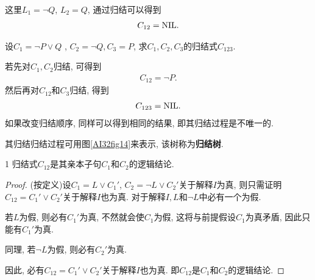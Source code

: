 \begin{result}
这里$L_1=\neg Q$, $L_2=Q$, 通过归结可以得到
\begin{align}
  C_{12}= \textup{NIL}.
\end{align}
\end{result}
\begin{example}
  设$C_1  =\neg P \vee  Q$ , $C_2 =\neg Q,C_3=P$, 求$C_1,C_2 ,C_3$的归结式$C_{123}$.
\end{example}
\begin{result}
若先对$C_1,C_2$归结, 可得到
\begin{align}
  C_{1 2}=\neg P.
\end{align}
然后再对$C_{12}$和$C_3$归结, 得到
\begin{align}
  C_{123}=\textup{NIL}.
\end{align}
如果改变归结顺序, 同样可以得到相同的结果, 即其归结过程是不唯一的.
\end{result}

其归结归结过程可用图\ref{AI32fig14}来表示, 该树称为\textbf{归结树}.
\begin{mythm}{}{1}\label{AIthm3.1}
  归结式$C_{12}$是其亲本子句$C_1 $和$C_2$的逻辑结论.
\end{mythm}
\begin{proof}
(按定义)设$C_1 =L\vee C_1 '$, $C_2 =\neg L\vee C_2 '$关于解释$I$为真, 则只需证明$C_{1 2}= C_1' \vee C_2 '$关于解释$I$也为真.
对于解释$I, L$和$\neg L$中必有一个为假.

若$L$为假, 则必有$C_1'$为真, 不然就会使$C_1$为假, 这将与前提假设$C_1$为真矛盾, 因此只能有$C_1'$为真.

同理, 若$\neg L$为假, 则必有$C_2'$为真.

因此, 必有$C_{1 2}= C_1 '\vee C_2 '$关于解释$I$也为真. 即$C_{12}$是$C_1$和$C_2$的逻辑结论.
\end{proof}


